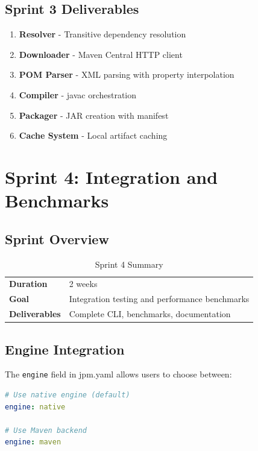 \documentclass[12pt,a4paper]{report}
\begin{document}
\section{Sprint 3 Deliverables}

\begin{enumerate}
    \item \textbf{Resolver} - Transitive dependency resolution
    \item \textbf{Downloader} - Maven Central HTTP client
    \item \textbf{POM Parser} - XML parsing with property interpolation
    \item \textbf{Compiler} - javac orchestration
    \item \textbf{Packager} - JAR creation with manifest
    \item \textbf{Cache System} - Local artifact caching
\end{enumerate}

\newpage

\chapter{Sprint 4: Integration and Benchmarks}

\section{Sprint Overview}

\begin{table}[H]
\centering
\begin{tabular}{ll}
\toprule
\textbf{Duration} & 2 weeks \\
\textbf{Goal} & Integration testing and performance benchmarks \\
\textbf{Deliverables} & Complete CLI, benchmarks, documentation \\
\bottomrule
\end{tabular}
\caption{Sprint 4 Summary}
\end{table}

\section{Engine Integration}

The \texttt{engine} field in jpm.yaml allows users to choose between:

\begin{lstlisting}[language=yaml, caption=Engine Selection]
# Use native engine (default)
engine: native

# Use Maven backend
engine: maven
\end{lstlisting}
\end{document}
